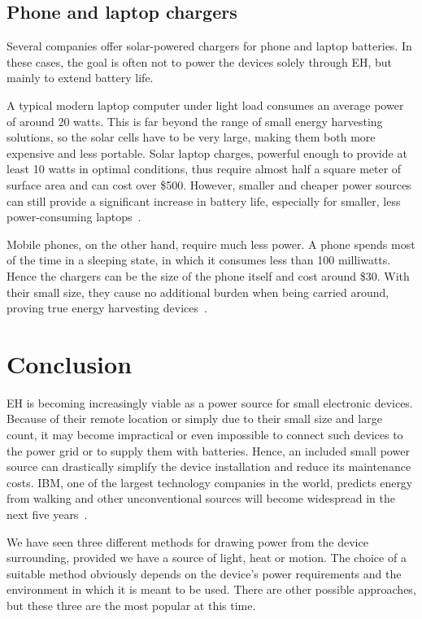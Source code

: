 \documentclass[a4paper,10pt]{article}
\begin{document}
\newpage
\subsection{Phone and laptop chargers}

Several companies offer solar-powered chargers for phone and laptop batteries. In these cases, the goal is often not to power the devices solely through \ac{EH}, but mainly to extend battery life. 

A typical modern laptop computer under light load consumes an average power of around 20 watts. This is far beyond the range of small energy harvesting solutions, so the solar cells have to be very large, making them both more expensive and less portable. Solar laptop charges, powerful enough to provide at least 10 watts in optimal conditions, thus require almost half a square meter of surface area and can cost over \$500. However, smaller and cheaper power sources can still provide a significant increase in battery life, especially for smaller, less power-consuming laptops~\cite{news:laptop-chargers}. 

Mobile phones, on the other hand, require much less power. A phone spends most of the time in a sleeping state, in which it consumes less than 100 milliwatts. Hence the chargers can be the size of the phone itself and cost around \$30. With their small size, they cause no additional burden when being carried around, proving true energy harvesting devices~\cite{mysolarphonecharger}. 


\section{Conclusion}

\acf{EH} is becoming increasingly viable as a power source for small electronic devices. Because of their remote location or simply due to their small size and large count, it may become impractical or even impossible to connect such devices to the power grid or to supply them with batteries. Hence, an included small power source can drastically simplify the device installation and reduce its maintenance costs. \acs{IBM}, one of the largest technology companies in the world, predicts energy from walking and other unconventional sources will become widespread in the next five years~\cite{ibm:5in5}. 

We have seen three different methods for drawing power from the device surrounding, provided we have a source of light, heat or motion. The choice of a suitable method obviously depends on the device's power requirements and the environment in which it is meant to be used. There are other possible approaches, but these three are the most popular at this time. 
\end{document}
